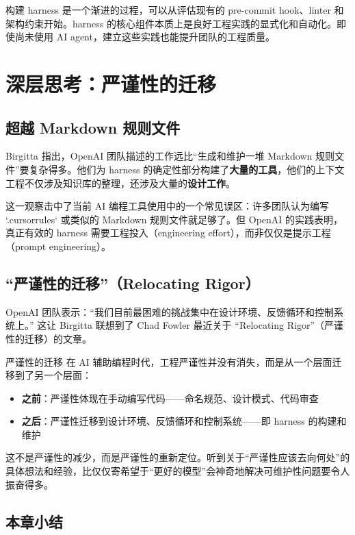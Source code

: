 \documentclass[a4paper]{article}
\begin{document}
构建 harness 是一个渐进的过程，可以从评估现有的 pre-commit hook、linter 和架构约束开始。harness 的核心组件本质上是良好工程实践的显式化和自动化。即使尚未使用 AI agent，建立这些实践也能提升团队的工程质量。

\newpage

\section{深层思考：严谨性的迁移}

\subsection{超越 Markdown 规则文件}

Birgitta 指出，OpenAI 团队描述的工作远比``生成和维护一堆 Markdown 规则文件''要复杂得多。他们为 harness 的确定性部分构建了\textbf{大量的工具}，他们的上下文工程不仅涉及知识库的整理，还涉及大量的\textbf{设计工作}。

这一观察击中了当前 AI 编程工具使用中的一个常见误区：许多团队认为编写 `.cursorrules` 或类似的 Markdown 规则文件就足够了。但 OpenAI 的实践表明，真正有效的 harness 需要工程投入（engineering effort），而非仅仅是提示工程（prompt engineering）。

\subsection{``严谨性的迁移''（Relocating Rigor）}

OpenAI 团队表示：``我们目前最困难的挑战集中在设计环境、反馈循环和控制系统上。'' 这让 Birgitta 联想到了 Chad Fowler 最近关于 ``Relocating Rigor''（严谨性的迁移）的文章。

\begin{importantbox}{严谨性的迁移}
在 AI 辅助编程时代，工程严谨性并没有消失，而是从一个层面迁移到了另一个层面：
\begin{itemize}[leftmargin=1.5em]
    \item \textbf{之前}：严谨性体现在手动编写代码------命名规范、设计模式、代码审查
    \item \textbf{之后}：严谨性迁移到设计环境、反馈循环和控制系统------即 harness 的构建和维护
\end{itemize}
这不是严谨性的减少，而是严谨性的重新定位。听到关于``严谨性应该去向何处''的具体想法和经验，比仅仅寄希望于``更好的模型''会神奇地解决可维护性问题要令人振奋得多。
\end{importantbox}

\subsection{本章小结}
\end{document}
